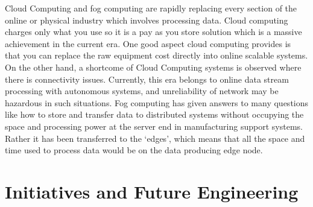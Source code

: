 Cloud Computing and fog computing are rapidly replacing every section of the online or physical industry which involves processing data. Cloud computing charges only what you use so it is a pay as you store solution which is a massive achievement in the current era. One good aspect cloud computing provides is that you can replace the raw equipment cost directly into online scalable systems. On the other hand, a shortcome of Cloud Computing systems is observed where there is connectivity issues. Currently, this era belongs to online data stream processing with autonomous systems, and unreliability of network may be hazardous in such situations. Fog computing has given answers to many questions like how to store and transfer data to distributed systems without occupying the space and processing power at the server end in manufacturing support systems. Rather it has been transferred to the ‘edges', which means that all the space and time used to process data would be on the data producing edge node. 

\section{Initiatives and Future Engineering}\label{sec:future_engineering}


